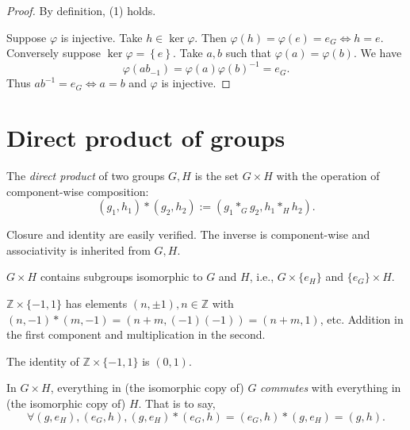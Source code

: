 \documentclass[10pt]{article}
\begin{document}
    \begin{proof}
        By definition, (1) holds.

        Suppose $ \varphi $ is injective. Take $ h\in \ker \varphi $. Then $ \varphi(h)=\varphi(e)=e_G \Leftrightarrow h=e $. Conversely suppose $ \ker \varphi=\left\{ e\right\} $. Take $ a,b $ such that $ \varphi(a)=\varphi(b) $. We have
        \[
            \varphi(ab_{-1})=\varphi(a)\varphi(b)^{-1}=e_G
        .\]
        Thus $ ab^{-1}=e_G \Leftrightarrow a=b $ and $ \varphi $ is injective.
    \end{proof}
    \section{Direct product of groups}
    \begin{definition}
        The \textit{direct product} of two groups $ G,H $ is the set $ G\times H $ with the operation of component-wise composition:
        \[
            (g_1,h_1) * (g_2,h_2):=(g_1*_G g_2, h_1 *_H h_2)
        .\]
    \end{definition}
    Closure and identity are easily verified. The inverse is component-wise and associativity is inherited from $G,H$.
    \begin{remark}
        $ G\times H $ contains subgroups isomorphic to $G$ and $H$, i.e., $ G \times \{e_H\} $ and $ \{e_G\} \times H $.
    \end{remark}
    \begin{example}
        $ \mathbb{Z} \times \{-1,1\} $ has elements $ (n,\pm 1), n\in \mathbb{Z} $ with $ (n,-1)*(m,-1)=(n+m,(-1)(-1))=(n+m,1) $, etc. Addition in the first component and multiplication in the second.

        The identity of $\mathbb{Z} \times \{-1,1\}$ is $(0,1)$.
    \end{example}
    \begin{remark}
        In $ G \times H $, everything in (the isomorphic copy of) $G$ \textit{commutes} with everything in (the isomorphic copy of) $H$. That is to say,
        \[
            \forall (g,e_H), (e_G,h), (g,e_H)*(e_G,h) = (e_G, h)*(g,e_H)=(g,h)
        .\]
    \end{remark}
\end{document}
